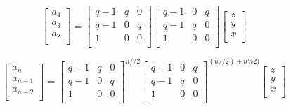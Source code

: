 \documentclass[paper.tex]{subfiles}
\begin{document}
\[ 
\left[ \begin{array}{ccc}
a_{4} \\
a_{3} \\
a_{2} \\
\end{array} \right] 
=
\left[ \begin{array}{ccc}
q-1 & q & 0 \\
q-1 & 0 & q \\
1 & 0 & 0 \\
\end{array} \right]
\left[ \begin{array}{ccc}
q-1 & 0 & q \\
q-1 & q & 0 \\
1 & 0 & 0 \\
\end{array} \right]
\left[ \begin{array}{ccc}
z \\
y \\
x \\
\end{array} \right] 
\] 

\[ 
\left[ \begin{array}{ccc}
a_{n} \\
a_{n-1} \\
a_{n-2} \\
\end{array} \right] 
=
\left[ \begin{array}{ccc}
q-1 & q & 0 \\
q-1 & 0 & q \\
1 & 0 & 0 \\
\end{array} \right] ^{n//2} 
\left[ \begin{array}{ccc}
q-1 & 0 & q \\
q-1 & q & 0 \\
1 & 0 & 0 \\
\end{array} \right] ^{(n//2) + n\%2)}
\left[ \begin{array}{ccc}
z \\
y \\
x \\
\end{array} \right] 
\] 
\end{document}
